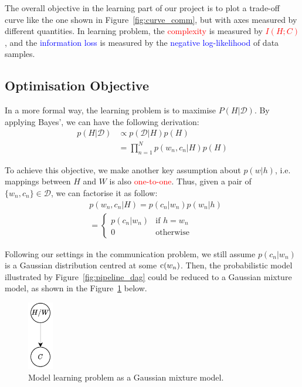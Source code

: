 \documentclass[11pt]{article}
\begin{document}
The overall objective in the learning part of our project is to plot a trade-off curve like the one shown in Figure~\ref{fig:curve_comm}, but with axes measured by different quantities.
In learning problem, the \textcolor{red}{complexity} is measured by \textcolor{red}{$I(H;C)$}, and the \textcolor{blue}{information loss} is measured by the \textcolor{blue}{negative log-likelihood} of data samples. 

\subsection{Optimisation Objective}
\label{ssec:learn_optim}

In a more formal way, the learning problem is to maximise $P(H|\mathcal{D})$. 
By applying Bayes', we can have the following derivation:
\begin{equation}
    \begin{split}
        p(H|\mathcal{D})
        & \propto p(\mathcal{D}|H)p(H) \\
        & = \prod_{n=1}^{N} p(w_n, c_n|H)p(H)
    \end{split}
    \label{eq:learning_objective_pH_D}
\end{equation}

To achieve this objective, we make another key assumption about $p(w|h)$, i.e. mappings between $H$ and $W$ is also \textcolor{red}{one-to-one}.
Thus, given a pair of $\{w_n, c_n\}\in\mathcal{D}$, we can factorise it as follow:
\begin{equation}
    \begin{aligned}
     & p(w_n, c_n|H) = p(c_n|w_n)p(w_n|h) \\
     & =
        \begin{cases}
            p(c_n|w_n) & \text{if $h=w_n$}\\
            0 & \text{otherwise}
        \end{cases} 
    \end{aligned}
    \label{eq:factorise_data_pair}
\end{equation}

Following our settings in the communication problem, we still assume $p(c_n|w_n)$ is a Gaussian distribution centred at some ${\textnormal{c}}(w_n)$.
Then, the probabilistic model illustrated by Figure~\ref{fig:pipeline_dag} could be reduced to a Gaussian mixture model, as shown in the Figure~\ref{fig:learn_gaussian_mix} below.
\begin{figure}[h]
    \centering
    \includegraphics[width=0.1\textwidth]{docs/intro_rate_distortion/graphs/mixture_gaussian.pdf}
    \caption{Model learning problem as a Gaussian mixture model.}
    \label{fig:learn_gaussian_mix}
\end{figure}
\end{document}
